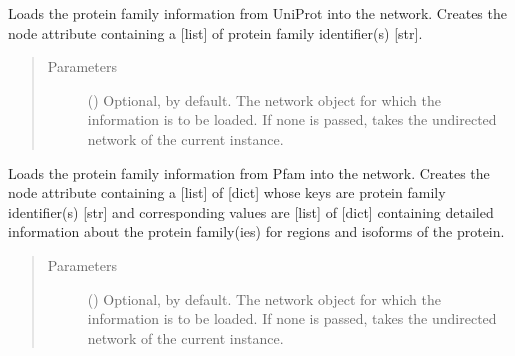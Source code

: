 \documentclass[letterpaper,10pt,english]{sphinxmanual}
\begin{document}
\begin{fulllineitems}

\begin{fulllineitems}
\label{\detokenize{reference:pypath.main.PyPath.load_pfam}}
Loads the protein family information from UniProt into the
network. Creates the node attribute  containing a
{[}list{]} of protein family identifier(s) {[}str{]}.
\begin{quote}\begin{description}
\item[{Parameters}] \leavevmode
{} () \textendash{} Optional,  by default. The network object for which
the information is to be loaded. If none is passed, takes
the undirected network of the current instance.

\end{description}\end{quote}

\end{fulllineitems}


\begin{fulllineitems}
\label{\detokenize{reference:pypath.main.PyPath.load_pfam2}}
Loads the protein family information from Pfam into the network.
Creates the node attribute  containing a {[}list{]} of
{[}dict{]} whose keys are protein family identifier(s) {[}str{]} and
corresponding values are {[}list{]} of {[}dict{]} containing detailed
information about the protein family(ies) for regions and
isoforms of the protein.
\begin{quote}\begin{description}
\item[{Parameters}] \leavevmode
{} () \textendash{} Optional,  by default. The network object for which
the information is to be loaded. If none is passed, takes
the undirected network of the current instance.


\end{description}
\end{quote}
\end{fulllineitems}
\end{fulllineitems}
\end{document}
